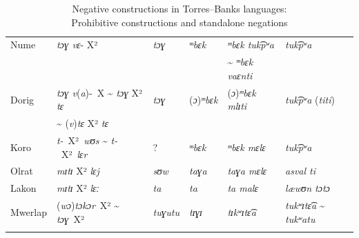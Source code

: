 \documentclass[output=paper,colorlinks,citecolor=brown,draft]{langscibook}
\begin{document}
\begin{table}
\begin{tabularx}{\textwidth}{lXXXXX}
{Nume} &  \textit{tɔɣ vɛ}- X² & \textit{tɔɣ} & \textit{ᵐbɛk} & \textit{ᵐbɛk tuk​͡pʷa} & \textit{tuk​͡pʷa} \\
&&&& {\textasciitilde} \textit{ᵐbɛk vaɛnti} & \\
{Dorig} & \textit{tɔɣ v}(\textit{a})-~X {\textasciitilde} \textit{tɔɣ} X² \textit{tɛ} & \textit{tɔɣ} & (\textit{ɔ})\textit{ᵐbɛk} & (\textit{ɔ})\textit{ᵐbɛk mlɪti} & \textit{tuk​͡pʷa} (\textit{titi}) \\
& {\textasciitilde} (\textit{v})\textit{tɛ} X² \textit{tɛ} &&&& \\
{Koro} &  \textit{t-}~X²~\textit{wʊs} {\textasciitilde} \textit{t-}~X²~\textit{lɛr} & ? & \textit{ᵐbɛk} & \textit{ᵐbɛk mɛlɛ} & \textit{tuk​͡pʷa}\\
{Olrat} &  \textit{mɪtɪ} X² \textit{lɛj} & \textit{sʊw} & \textit{taɣa} & \textit{taɣa mɛlɛ} & \textit{asval ti}\\
{Lakon} &  \textit{mɪtɪ} X² \textit{lɛː} & \textit{ta} & \textit{ta} & \textit{ta malɛ} & \textit{læwʊn tɔtɔ}\\
{Mwerlap} &  (\textit{wɔ})\textit{tɔkɔr}~X² {\textasciitilde} \textit{tɔɣ}~X² & \textit{tuɣutu} & \textit{tɪɣɪ} & \textit{tɪkʷɪtɛ​͡a} & \textit{tukʷɪtɛ​͡a} {\textasciitilde} \textit{tukʷatu}\\
\lspbottomrule
\end{tabularx}
\caption{Negative constructions in Torres–Banks languages:\\ Prohibitive constructions and standalone negations}
\label{tab:dor:standalone}
\end{table}



\end{document}
